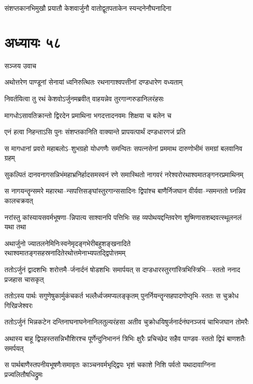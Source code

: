 \twolineshloka
{संशप्तकानभिमुखौ प्रयातौ केशवार्जुनौ}
{वातोद्वूतपताकेन स्यन्दनेनौघनादिना}


\chapter{अध्यायः ५८}
\twolineshloka
{सञ्जय उवाच}
{}


\twolineshloka
{अथोत्तरेण पाण्डूनां सेनायां ध्वनिरुत्थितः}
{रथनागाश्वपत्तीनां दण्डधारेण वध्यताम्}


\twolineshloka
{निवर्तयित्वा तु रथं केशवोऽर्जुनमब्रवीत्}
{वाहयन्नेव तुरगान्गरुडानिलरंहसः}


\twolineshloka
{मागधोऽसावतिक्रान्तो द्विरदेन प्रमाथिना}
{भगदत्तादनवमः शिक्षया च बलेन च}


\twolineshloka
{एनं हत्वा निहन्ताऽसि पुनः संशप्तकानिति}
{वाक्यान्ते प्रापयत्पार्थं दण्डधारगजं प्रति}


\twolineshloka
{स मागधानां प्रवरो महाबलोऽ--शुभग्रहो योधगणैः समन्वितः}
{सपत्नसेनां प्रममाथ दारुणोभीमं समग्रां बलवानिव ग्रहम्}


\twolineshloka
{सुकल्पितं दानवनागसन्निभंमहाभ्रनिर्हादसमस्वनं रणे}
{समास्थितो नागवरं नरेश्वरोरथाश्वमातङ्गनरप्रमाथिनम्}


\twolineshloka
{स नागयन्तॄन्समरे महारथा--न्सपत्तिसङ्घांस्तुरगान्ससादिनः}
{द्विपांश्च बाणैर्निजघान वीर्यवा--न्समन्ततो घ्नन्निव कालचक्रवत्}


\twolineshloka
{नरांस्तु कांस्यायसवर्मभूषणा--न्निपात्य साश्वानपि पत्तिभिः सह}
{व्यपोथयद्दन्तिवरेण शुष्मिणासशब्दवत्स्थूलनलं यथा तथा}


\twolineshloka
{अथार्जुनो ज्यातलनेमिनिःस्वनेमृदङ्गभेरीबहुशङ्खनादिते}
{रथाश्वमातङ्गसहस्रनादितेरथोत्तमेनाभ्यपतद्द्विपोत्तमम्}


\twolineshloka
{ततोऽर्जुनं द्वादशभिः शरोत्तमै--र्जनार्दनं षोडशभिः समार्पयत्}
{स दण़्डधारस्तुरगांस्त्रिभिस्त्रिभि---स्ततो ननाद प्रजहास चासकृत्}


\twolineshloka
{ततोऽस्य पार्थः सगुणेषुकार्मुकंचकर्त भल्लैर्ध्वजमप्यलङ्कृतम्}
{पुनर्नियन्तॄन्सहपादगोप्तृभि--स्ततः स चुक्रोध गिरिव्रजेश्वरः}


\twolineshloka
{ततोऽर्जुनं भिन्नकटेन दन्तिनाघनाघनेनानिलतुल्यरंहसा}
{अतीव चुक्रोधयिषुर्जनार्दनंघनञ्जयं चाभिजघान तोमरैः}


\twolineshloka
{अथास्य बाहू द्विपहस्तसन्निभौशिरश्च पूर्णेन्दुनिभाननं त्रिभिः}
{क्षुरैः प्रचिच्छेद सहैव पाण्डव--स्ततो द्विपं बाणशतैः समर्पयत्}


\twolineshloka
{स पार्थबाणैस्तपनीयभूषणैःसमावृतः काञ्चनवर्मभृद्द्विपः}
{भृशं चकाशे निशि पर्वतो यथादावाग्निना प्रज्वलितौषधिद्रुमः}



